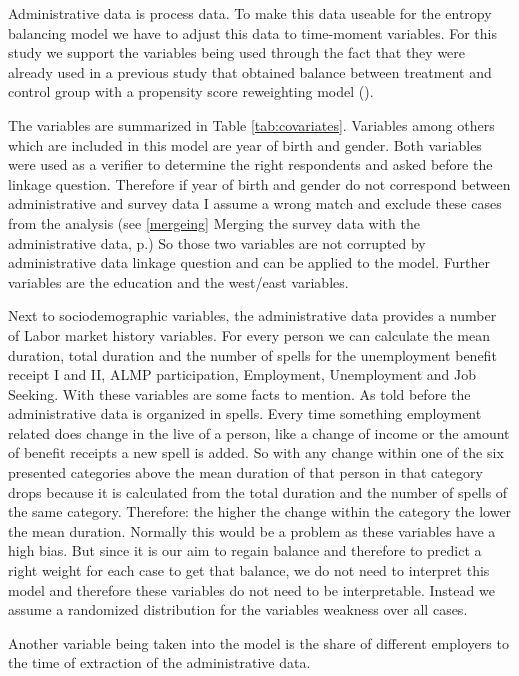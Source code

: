 Administrative data is process data. To make this data useable for the entropy balancing model we have to adjust this data to time-moment variables. For this study we support the variables being used through the fact that they were already used in a previous study that obtained balance between treatment and control group with a propensity score reweighting model (\cite{Bach15}).

The variables are summarized in Table \ref{tab:covariates}. Variables among others which are included in this model are year of birth and gender. Both variables were used as a verifier to determine the right respondents and asked before the linkage question. Therefore if year of birth and gender do not correspond between administrative and survey data I assume a wrong match and exclude these cases from the analysis (see \ref{mergeing} Merging the survey data with the administrative data, p.\pageref{mergeing}) So those two variables are not corrupted by administrative data linkage question and can be applied to the model. Further variables are the education and the west/east variables.



Next to sociodemographic variables, the administrative data provides a number of Labor market history variables. For every person we can calculate the mean duration, total duration and the number of spells for the unemployment benefit receipt I and II, ALMP participation, Employment, Unemployment and Job Seeking. With these variables are some facts to mention. As told before the administrative data is organized in spells. Every time something employment related does change in the live of a person, like a change of income or the amount of benefit receipts a new spell is added. So with any change within one of the six presented categories above the mean duration of that person in that category drops because it is calculated from the total duration and the number of spells of the same category. Therefore: the higher the change within the category the lower the mean duration. Normally this would be a problem as these variables have a high bias. But since it is our aim to regain balance and therefore to predict a right weight for each case to get that balance, we do not need to interpret this model and therefore these variables do not need to be interpretable. Instead we assume a randomized distribution for the variables weakness over all cases.

Another variable being taken into the model is the share of different employers to the time of extraction of the administrative data.

